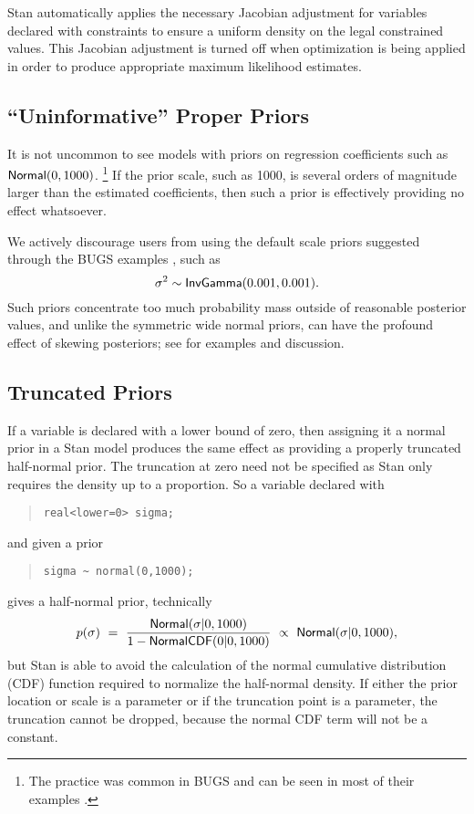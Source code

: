 Stan automatically applies the necessary Jacobian adjustment for
variables declared with constraints to ensure a uniform density on the
legal constrained values.  This Jacobian adjustment is turned off when
optimization is being applied in order to produce appropriate maximum
likelihood estimates.

\subsection{``Uninformative'' Proper Priors}

It is not uncommon to see models with priors on regression
coefficients such as $\mbox{\sf Normal}(0,1000)$.%
%
\footnote{The practice was common in BUGS and can be seen in most of
  their examples \cite{LunnEtAl:2012}.}
%
If the prior scale, such as 1000, is several orders of magnitude
larger than the estimated coefficients, then such a prior is
effectively providing no effect whatsoever.  

We actively discourage users from using the default scale priors
suggested through the BUGS examples \citep{LunnEtAl:2012}, such as
\[
\sigma^2 \sim \mbox{\sf InvGamma}(0.001, 0.001).
\]
%
Such priors concentrate too much probability mass outside of
reasonable posterior values, and unlike the symmetric wide normal
priors, can have the profound effect of skewing posteriors; see
\citep{Gelman:2006} for examples and discussion.

\subsection{Truncated Priors}

If a variable is declared with a lower bound of zero, then assigning
it a normal prior in a Stan model produces the same effect as
providing a properly truncated half-normal prior.  The truncation at
zero need not be specified as Stan only requires the density up to a
proportion.  So a variable declared with
%
\begin{quote}
\begin{Verbatim}
real<lower=0> sigma;
\end{Verbatim}
\end{quote}
%
and given a prior
\begin{quote}
\begin{Verbatim}
sigma ~ normal(0,1000);
\end{Verbatim}
\end{quote}
%
gives  a half-normal prior, technically
%
\[
p(\sigma) 
\ = \
\frac{\mbox{\sf Normal}(\sigma|0,1000)}
     {1 - \mbox{\sf NormalCDF}(0|0,1000)}
\ \propto \
\mbox{\sf Normal}(\sigma|0,1000),
\]
%
but Stan is able to avoid the calculation of the normal cumulative
distribution (CDF) function required to normalize the half-normal density.
If either the prior location or scale is a parameter or if the
truncation point is a parameter, the truncation cannot be dropped,
because the normal CDF term will not be a constant.


